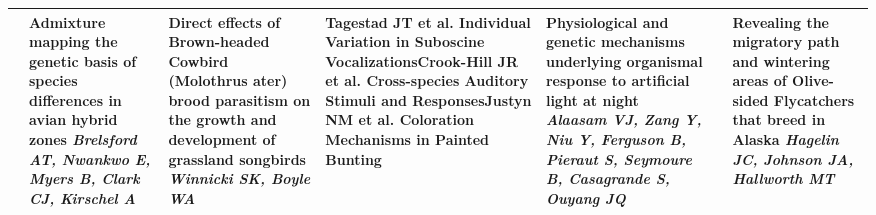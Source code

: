 \begin{tabular}{|x{0.75cm}|x{2.25cm}|x{2.25cm}|x{2.25cm}|a{2.25cm}|a{2.25cm}|a{2.25cm}|}
&Admixture mapping the genetic basis of species differences in avian hybrid zones \newline \newline \textit{Brelsford AT, Nwankwo E, Myers B, Clark CJ, Kirschel A} & Direct effects of Brown-headed Cowbird (Molothrus ater) brood parasitism on the growth and development of grassland songbirds \newline \newline \textit{Winnicki SK, Boyle WA} & \scriptsize Tagestad JT et al. \newline \tiny Individual Variation in Suboscine Vocalizations\newline \newline \scriptsize Crook-Hill JR et al. \newline \tiny Cross-species Auditory Stimuli and Responses\newline \newline \scriptsize Justyn NM et al. \newline \tiny Coloration Mechanisms in Painted Bunting & Physiological and genetic mechanisms underlying organismal response to artificial light at night \newline \newline \textit{Alaasam VJ, Zang Y, Niu Y, Ferguson B, Pieraut S, Seymoure B, Casagrande S, Ouyang JQ} &  \newline \newline \textit{} & Revealing the migratory path and wintering areas of Olive-sided Flycatchers that breed in Alaska \newline \newline \textit{Hagelin JC, Johnson JA, Hallworth MT}\\
\hline

\end{tabular}
